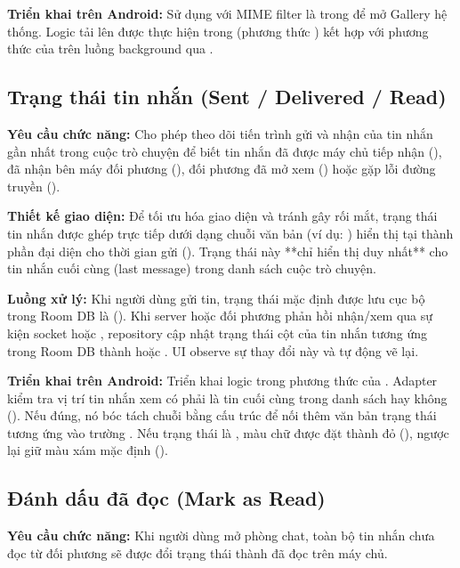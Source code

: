 \textbf{Triển khai trên Android:} Sử dụng  với MIME filter là  trong  để mở Gallery hệ thống. Logic tải lên được thực hiện trong  (phương thức ) kết hợp với phương thức  của  trên luồng background qua .

\subsection{Trạng thái tin nhắn (Sent / Delivered / Read)}
\textbf{Yêu cầu chức năng:} Cho phép theo dõi tiến trình gửi và nhận của tin nhắn gần nhất trong cuộc trò chuyện để biết tin nhắn đã được máy chủ tiếp nhận (), đã nhận bên máy đối phương (), đối phương đã mở xem () hoặc gặp lỗi đường truyền ().

\textbf{Thiết kế giao diện:} Để tối ưu hóa giao diện và tránh gây rối mắt, trạng thái tin nhắn được ghép trực tiếp dưới dạng chuỗi văn bản (ví dụ: ) hiển thị tại thành phần  đại diện cho thời gian gửi (). Trạng thái này **chỉ hiển thị duy nhất** cho tin nhắn cuối cùng (last message) trong danh sách cuộc trò chuyện.

\textbf{Luồng xử lý:} Khi người dùng gửi tin, trạng thái mặc định được lưu cục bộ trong Room DB là  (). Khi server hoặc đối phương phản hồi nhận/xem qua sự kiện socket  hoặc , repository cập nhật trạng thái cột  của tin nhắn tương ứng trong Room DB thành  hoặc . UI observe sự thay đổi này và tự động vẽ lại.

\textbf{Triển khai trên Android:} Triển khai logic trong phương thức  của . Adapter kiểm tra vị trí tin nhắn xem có phải là tin cuối cùng trong danh sách hay không (). Nếu đúng, nó bóc tách chuỗi  bằng cấu trúc  để nối thêm văn bản trạng thái tương ứng vào trường . Nếu trạng thái là , màu chữ được đặt thành đỏ (), ngược lại giữ màu xám mặc định ().

\subsection{Đánh dấu đã đọc (Mark as Read)}
\textbf{Yêu cầu chức năng:} Khi người dùng mở phòng chat, toàn bộ tin nhắn chưa đọc từ đối phương sẽ được đổi trạng thái thành đã đọc trên máy chủ.

